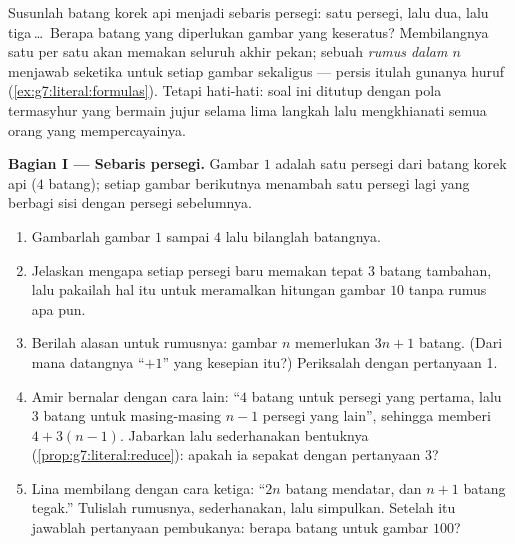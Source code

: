 \begin{problem}
\label{pb:g7:literal:1}
Susunlah batang korek api menjadi sebaris persegi: satu persegi, lalu
dua, lalu tiga\,\dots\ Berapa batang yang diperlukan gambar yang
keseratus? Membilangnya satu per satu akan memakan seluruh akhir
pekan; sebuah \emph{rumus dalam $n$} menjawab seketika untuk setiap
gambar sekaligus --- persis itulah gunanya huruf
(\cref{ex:g7:literal:formulas}). Tetapi hati-hati: soal ini ditutup
dengan pola termasyhur yang bermain jujur selama lima langkah lalu
mengkhianati semua orang yang mempercayainya.

\medskip
\noindent\textbf{Bagian I --- Sebaris persegi.}
Gambar $1$ adalah satu persegi dari batang korek api ($4$ batang);
setiap gambar berikutnya menambah satu persegi lagi yang berbagi sisi
dengan persegi sebelumnya.
\begin{enumerate}
  \item Gambarlah gambar $1$ sampai $4$ lalu bilanglah batangnya.
  \item Jelaskan mengapa setiap persegi baru memakan tepat $3$ batang
        tambahan, lalu pakailah hal itu untuk meramalkan hitungan
        gambar $10$ tanpa rumus apa pun.
  \item Berilah alasan untuk rumusnya: gambar $n$ memerlukan $3n + 1$
        batang. (Dari mana datangnya ``$+1$'' yang kesepian itu?)
        Periksalah dengan pertanyaan 1.
  \item Amir bernalar dengan cara lain: ``$4$ batang untuk persegi
        yang pertama, lalu $3$ batang untuk masing-masing $n - 1$
        persegi yang lain'', sehingga memberi $4 + 3(n - 1)$.
        Jabarkan lalu sederhanakan bentuknya
        (\cref{prop:g7:literal:reduce}): apakah ia sepakat dengan
        pertanyaan 3?
  \item Lina membilang dengan cara ketiga: ``$2n$ batang mendatar, dan
        $n + 1$ batang tegak.'' Tulislah rumusnya, sederhanakan, lalu
        simpulkan. Setelah itu jawablah pertanyaan pembukanya: berapa
        batang untuk gambar $100$?
\end{enumerate}


\end{problem}
